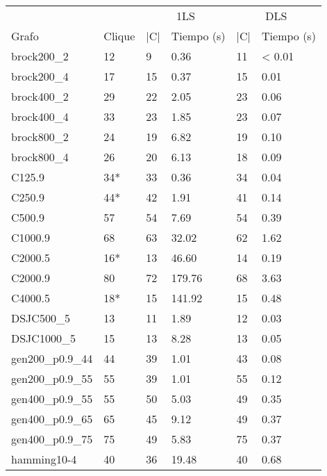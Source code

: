 \begin{small}
  \begin{longtable}{l l l l l l}
  \label{table:bl}\\
    & & \multicolumn{2}{c}{1LS} & \multicolumn{2}{c}{DLS} \\ \cline{3-6}
    Grafo              & Clique & |C| & Tiempo (s) & |C| & Tiempo (s) \\ \hline
    \endhead
    \endfoot
    brock200\_2        & 12 & 9 & 0.36 & 11 & < 0.01   \\ \hline
    brock200\_4        & 17 & 15 & 0.37 & 15 & 0.01   \\ \hline
    brock400\_2        & 29 & 22 & 2.05 & 23 & 0.06   \\ \hline
    brock400\_4        & 33 & 23 & 1.85 & 23 & 0.07   \\ \hline
    brock800\_2        & 24 & 19 & 6.82 & 19 & 0.10   \\ \hline
    brock800\_4        & 26 & 20 & 6.13 & 18 & 0.09   \\ \hline
    C125.9             & 34* & 33 & 0.36 & 34 & 0.04   \\ \hline
    C250.9             & 44* & 42 & 1.91 & 41 & 0.14   \\ \hline
    C500.9             & 57 & 54 & 7.69 & 54 & 0.39   \\ \hline
    C1000.9            & 68 & 63 & 32.02 & 62 & 1.62   \\ \hline
    C2000.5            & 16* & 13 & 46.60 & 14 & 0.19  \\ \hline
    C2000.9            & 80 & 72 & 179.76 & 68 & 3.63  \\ \hline
    C4000.5            & 18* & 15 & 141.92 & 15 & 0.48   \\ \hline
    DSJC500\_5         & 13 & 11 & 1.89 & 12 & 0.03   \\ \hline
    DSJC1000\_5        & 15 & 13 & 8.28 & 13 & 0.05   \\ \hline
    gen200\_p0.9\_44   & 44 & 39 & 1.01 & 43 & 0.08   \\ \hline
    gen200\_p0.9\_55   & 55 & 39 & 1.01 & 55 & 0.12   \\ \hline
    gen400\_p0.9\_55   & 55 & 50 & 5.03 & 49 & 0.35   \\ \hline
    gen400\_p0.9\_65   & 65 & 45 & 9.12 & 49 & 0.37   \\ \hline
    gen400\_p0.9\_75   & 75 & 49 & 5.83 & 75 & 0.37   \\ \hline
    hamming10-4        & 40 & 36 & 19.48 & 40 & 0.68   \\ \hline

\end{longtable}
\end{small}
